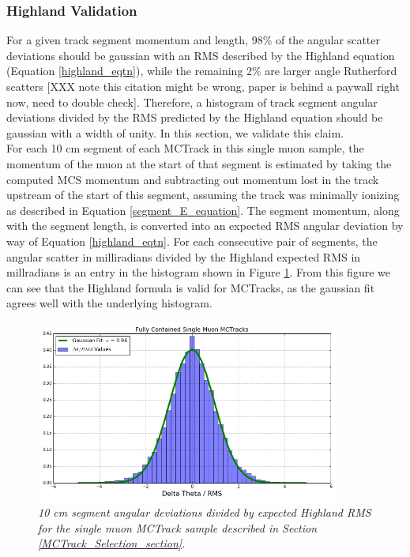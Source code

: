 \subsubsection{Highland Validation}\label{Highland_Validation_MCTrack_section}
For a given track segment momentum and length, 98\% of the angular scatter deviations should be gaussian with an RMS described by the Highland equation (Equation \ref{highland_eqtn}), while the remaining 2\% are larger angle Rutherford scatters\cite{highland} [XXX note this citation might be wrong, paper is behind a paywall right now, need to double check]. Therefore, a histogram of track segment angular deviations divided by the RMS predicted by the Highland equation should be gaussian with a width of unity. In this section, we validate this claim.\\

For each 10 cm segment of each {\sc MCTrack} in this single muon sample, the momentum of the muon at the start of that segment is estimated by taking the computed MCS momentum and subtracting out momentum lost in the track upstream of the start of this segment, assuming the track was minimally ionizing as described in Equation \ref{segment_E_equation}. The segment momentum, along with the segment length, is converted into an expected RMS angular deviation by way of Equation \ref{highland_eqtn}. For each consecutive pair of segments, the angular scatter in milliradians divided by the Highland expected RMS in millradians is an entry in the histogram shown in Figure \ref{Highland_validation_MCTracks_fig}. From this figure we can see that the Highland formula is valid for {\sc MCTracks}, as the gaussian fit agrees well with the underlying histogram.

\begin{figure}[h!]
\begin{center}
\includegraphics[width=100mm]{Figures/Highland_validation_SingleMuonMCTrack.png}
\end{center}
\caption{\textit{10 cm segment angular deviations divided by expected Highland RMS for the single muon {\sc MCTrack} sample described in Section \ref{MCTrack_Selection_section}.}}
\label{Highland_validation_MCTracks_fig}
\end{figure}













